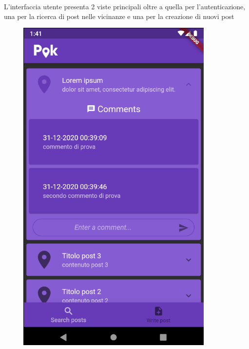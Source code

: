 \documentclass[a4paper]{article}
\begin{document}
L'interfaccia utente presenta 2 viste principali oltre a quella per l'autenticazione, una per la ricerca di post nelle vicinanze e una per la creazione di nuovi post

\vspace{1.05cm}

\begin{figure}[h!]
   \centering
   \includegraphics[scale=0.6]{ricercapost} 

\end{figure}
\end{document}
